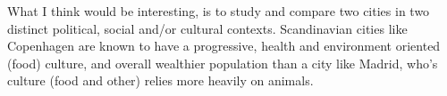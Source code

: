 \documentclass{article}
\begin{document}
What I think would be interesting, is to study and compare two cities in two distinct political, social and/or cultural contexts. Scandinavian cities like Copenhagen are known to have a progressive, health and environment oriented (food) culture, and overall wealthier population than a city like Madrid, who's culture (food and other) relies more heavily on animals.



\begin{comment}
\textbf{Topic}: Overprotecting: how do regulations restricting the engagement of people with the natural or built environment in the city affect our experience
Maybe this culminates in the pandemic, where the State mandated people to stay home - using public space and infrastructure like benches, parks, playgrounds... 
\end{comment}

\begin{comment}
\textbf{Topic \# 3 Smart cities for citizens - resisting big tech but embracing progress}
\textbf{Potential supervisor}: Corentin Debailleul
Smart cities is a concept that makes city officials buzz. Unfortunately, smart solutions are often implemented by private investors seeking a profit, without the proper research, without consulting local residents, and with the Silicon Valley mindset of `fail fast, fail often' which is not ethical in an urban environment where everyday people are both testers and users. At best, smart solutions don't address the issues they intend, and at worst, they are dangerous - reinforcing racist or sexist biases, putting our physical persons in danger, or breaching our privacy. 
Without wanting to sound cliché, and as software engineer myself, I will say that technology is coming to our cities whether we want it or not. 
It is therefore relevant to understand how smart cities and popular 
And, technology has great power. Ideally, 
\end{comment}

\printbibliography
\end{document}
